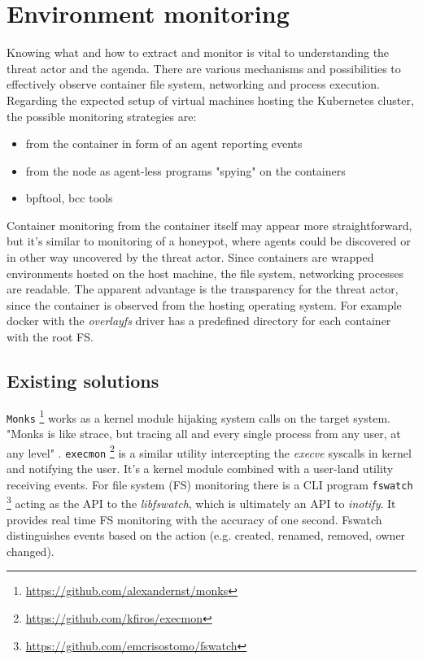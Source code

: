 \section{Environment monitoring \label{anal:mon}}
Knowing what and how to extract and monitor is vital to understanding the threat actor and the agenda. There are various mechanisms and possibilities to effectively observe container file system, networking and process execution. Regarding the expected setup of virtual machines hosting the Kubernetes cluster, the possible monitoring strategies are:

\begin{itemize}[noitemsep]
	\item
	from the container in form of an agent reporting events
	\item 
	from the node as agent-less programs "spying" on the containers
	\item 
	bpftool, bcc tools
\end{itemize}

Container monitoring from the container itself may appear more straightforward, but it's similar to monitoring of a honeypot, where agents could be discovered or in other way uncovered by the threat actor. Since containers are wrapped environments hosted on the host machine, the file system, networking processes are readable. The apparent advantage is the transparency for the threat actor, since the container is observed from the hosting operating system. For example docker with the \textit{overlayfs} driver has a predefined directory for each container with the root FS.

\subsection{Existing solutions \label{anal:mon:exist}}
\texttt{Monks} \footnote{\url{https://github.com/alexandernst/monks}} works as a kernel module hijaking system calls on the target system. "Monks is like strace, but tracing all and every single process from any user, at any level" \cite{git:monks}. \texttt{execmon} \footnote{\url{https://github.com/kfiros/execmon}} is a similar utility intercepting the \textit{execve} syscalls in kernel and notifying the user. It's a kernel module combined with a user-land utility receiving events. For file system (FS) monitoring there is a CLI program \texttt{fswatch} \footnote{\url{https://github.com/emcrisostomo/fswatch}} acting as the API to the \textit{libfswatch}, which is ultimately an API to \textit{inotify}. It provides real time FS monitoring with the accuracy of one second. Fswatch distinguishes events based on the action (e.g. created, renamed, removed, owner changed).